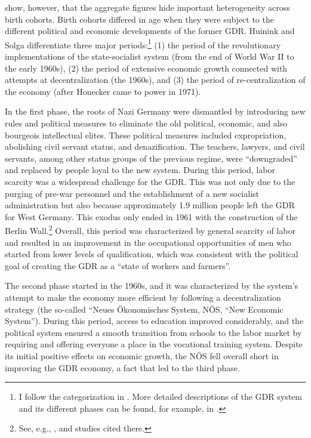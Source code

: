 \begin{Article}
\begin{refsection}[Spitz]
\cite{HuininkSolga1994} show, however, that the aggregate figures hide important heterogeneity across birth cohorts. Birth cohorts differed in age when they were subject to the different political and economic developments of the former GDR. Huinink and Solga differentiate three major periods:\footnote{I follow the categorization in \cite{HuininkSolga1994}. More detailed descriptions of the GDR system and its different phases can be found, for example, in \cite{Ritschl1995}.} (1) the period of the revolutionary implementations of the state-socialist system (from the end of World War II to the early 1960s), (2) the period of extensive economic growth connected with attempts at decentralization (the 1960s), and (3) the period of re-centralization of the economy (after Honecker came to power in 1971).

In the first phase, the roots of Nazi Germany were dismantled by introducing new rules and political measures to eliminate the old political, economic, and also bourgeois intellectual elites. These political measures included expropriation, abolishing civil servant status, and denazification. The teachers, lawyers, and civil servants, among other status groups of the previous regime, were ``downgraded'' and replaced by people loyal to the new system. During this period, labor scarcity was a widespread challenge for the GDR. This was not only due to the purging of pre-war personnel and the establishment of a new socialist administration but also because approximately 1.9 million people left the GDR for West Germany. This exodus only ended in 1961 with the construction of the Berlin Wall.\footnote{See, e.g., \cite{BlackLiepmannRemigereauSpitzOener2022}, and studies cited there.} Overall, this period was characterized by general scarcity of labor and resulted in an improvement in the occupational opportunities of men who started from lower levels of qualification, which was consistent with the political goal of creating the GDR as a ``state of workers and farmers''.

The second phase started in the 1960s, and it was characterized by the system's attempt to make the economy more efficient by following a decentralization strategy (the so-called ``Neues \"Okonomisches System, N\"OS, ``New Economic System''). During this period, access to education improved considerably, and the political system ensured a smooth transition from schools to the labor market by requiring and offering everyone a place in the vocational training system. Despite its initial positive effects on economic growth, the N\"OS fell overall short in improving the GDR economy, a fact that led to the third phase.


\end{refsection}
\end{Article}

